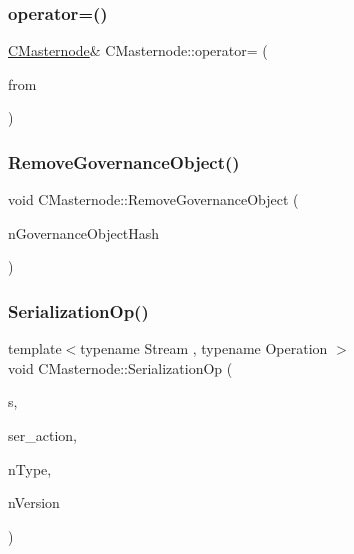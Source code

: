 \mbox{\label{class_c_masternode_a914fcf71ebc13a0680bb61e173b206f4}} 
\subsubsection{\texorpdfstring{operator=()}{operator=()}}
{\footnotesize\ttfamily \mbox{\hyperlink{class_c_masternode}{C\+Masternode}}\& C\+Masternode\+::operator= (\begin{DoxyParamCaption}\item[{\mbox{\hyperlink{class_c_masternode}{C\+Masternode}}}]{from }\end{DoxyParamCaption})\hspace{0.3cm}{\ttfamily [inline]}}

\mbox{\label{class_c_masternode_ab8751705e6fa01ebb18dae7162d70b63}} 
\subsubsection{\texorpdfstring{Remove\+Governance\+Object()}{RemoveGovernanceObject()}}
{\footnotesize\ttfamily void C\+Masternode\+::\+Remove\+Governance\+Object (\begin{DoxyParamCaption}\item[{\mbox{\hyperlink{classuint256}{uint256}}}]{n\+Governance\+Object\+Hash }\end{DoxyParamCaption})}

\mbox{\label{class_c_masternode_ac3514c93cc494ae196dc217df847950d}} 
\subsubsection{\texorpdfstring{Serialization\+Op()}{SerializationOp()}}
{\footnotesize\ttfamily template$<$typename Stream , typename Operation $>$ \\
void C\+Masternode\+::\+Serialization\+Op (\begin{DoxyParamCaption}\item[{Stream \&}]{s,  }\item[{Operation}]{ser\+\_\+action,  }\item[{int}]{n\+Type,  }\item[{int}]{n\+Version }\end{DoxyParamCaption})\hspace{0.3cm}{\ttfamily [inline]}}


